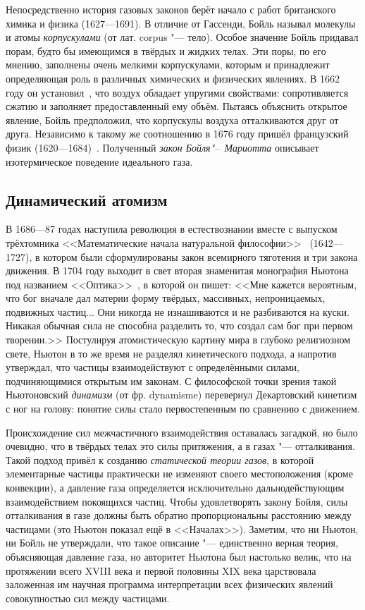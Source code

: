 \documentclass[a4paper, 12pt, oneside]{article} %
\begin{document}
Непосредственно история газовых законов берёт начало с работ британского
химика и физика  (1627---1691). В отличие от
Гассенди, Бойль называл молекулы и атомы \emph{корпускулами} (от лат.
corpus "--- тело). Особое значение Бойль придавал порам, будто бы
имеющимся в твёрдых и жидких телах. Эти поры, по его мнению, заполнены
очень мелкими корпускулами, которым и принадлежит определяющая роль в
различных химических и физических явлениях. В 1662 году он
установил~\cite{boyle1662new}, что воздух обладает упругими свойствами:
сопротивляется сжатию и заполняет предоставленный ему объём. Пытаясь
объяснить открытое явление, Бойль предположил, что корпускулы воздуха
отталкиваются друг от друга. Независимо к такому же соотношению в 1676
году пришёл французский физик 
(1620---1684)~\cite{mariotte1676new2}. Полученный \emph{закон
Бойля"--~Мариотта} описывает изотермическое поведение идеального газа.

\subsection{Динамический атомизм}

В 1686---87 годах наступила революция в естествознании вместе с выпуском
трёхтомника <<Математические начала натуральной
философии>>~\cite{newton1989principia} 
(1642---1727), в котором были сформулированы закон всемирного тяготения
и три закона движения. В 1704 году выходит в свет вторая знаменитая
монография Ньютона под названием <<Оптика>>~\cite{newton1927opticks}, в
которой он пишет: <<Мне кажется вероятным, что бог вначале дал материи
форму твёрдых, массивных, непроницаемых, подвижных частиц... Они никогда
не изнашиваются и не разбиваются на куски. Никакая обычная сила не
способна разделить то, что создал сам бог при первом творении.>>
Постулируя атомистическую картину мира в глубоко религиозном свете,
Ньютон в то же время не разделял кинетического подхода, а напротив
утверждал, что частицы взаимодействуют с определёнными силами,
подчиняющимися открытым им законам. С философской точки зрения такой
Ньютоновский \emph{динамизм} (от фр.
\foreignlanguage{french}{dynamisme}) перевернул Декартовский кинетизм с
ног на голову: понятие силы стало первостепенным по сравнению с
движением.

Происхождение сил межчастичного взаимодействия оставалась загадкой, но
было очевидно, что в твёрдых телах это силы притяжения, а в газах "---
отталкивания. Такой подход привёл к созданию \emph{статической теории
газов}, в которой элементарные частицы практически не изменяют своего
местоположения (кроме конвекции), а давление газа определяется
исключительно дальнодействующим взаимодействием покоящихся частиц. Чтобы
удовлетворять закону Бойля, силы отталкивания в газе должны быть обратно
пропорциональны расстоянию между частицами (это Ньютон показал ещё в
<<Началах>>). Заметим, что ни Ньютон, ни Бойль не утверждали, что такое
описание "--- единственно верная теория, объясняющая давление газа, но
авторитет Ньютона был настолько велик, что на протяжении всего XVIII
века и первой половины XIX века царствовала заложенная им научная
программа интерпретации всех физических явлений совокупностью сил между
частицами.
\end{document}
